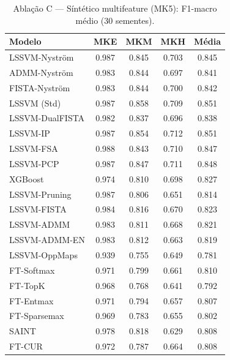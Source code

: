 \begin{table}[ht]
  \centering
  \caption{Ablação C — Síntético multifeature (MK5): F1-macro médio (30 sementes).}
  \label{tab:ablation_c}
  \footnotesize
  \begin{tabular}{lcccc}
    \toprule
    Modelo & MKE & MKM & MKH & Média \\
    \midrule
    LSSVM-Nyström & 0.987 & 0.845 & 0.703 & 0.845 \\
    ADMM-Nyström & 0.983 & 0.844 & 0.697 & 0.841 \\
    FISTA-Nyström & 0.983 & 0.844 & 0.700 & 0.842 \\
    LSSVM (Std) & 0.987 & 0.858 & 0.709 & 0.851 \\
    LSSVM-DualFISTA & 0.982 & 0.837 & 0.696 & 0.838 \\
    LSSVM-IP & 0.987 & 0.854 & 0.712 & 0.851 \\
    LSSVM-FSA & 0.988 & 0.843 & 0.710 & 0.847 \\
    LSSVM-PCP & 0.987 & 0.847 & 0.711 & 0.848 \\
    XGBoost & 0.974 & 0.810 & 0.698 & 0.827 \\
    LSSVM-Pruning & 0.987 & 0.806 & 0.651 & 0.814 \\
    LSSVM-FISTA & 0.984 & 0.816 & 0.670 & 0.823 \\
    LSSVM-ADMM & 0.983 & 0.811 & 0.668 & 0.821 \\
    LSSVM-ADMM-EN & 0.983 & 0.812 & 0.663 & 0.819 \\
    LSSVM-OppMaps & 0.939 & 0.755 & 0.649 & 0.781 \\
    FT-Softmax & 0.971 & 0.799 & 0.661 & 0.810 \\
    FT-TopK & 0.968 & 0.768 & 0.641 & 0.792 \\
    FT-Entmax & 0.971 & 0.794 & 0.657 & 0.807 \\
    FT-Sparsemax & 0.969 & 0.783 & 0.655 & 0.802 \\
    SAINT & 0.978 & 0.818 & 0.629 & 0.808 \\
    FT-CUR & 0.972 & 0.787 & 0.664 & 0.808 \\
    \bottomrule
  \end{tabular}
\end{table}
